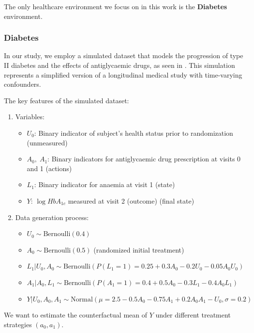 The only healthcare environment we focus on in this work is
the \textbf{Diabetes} environment.

\subsubsection{Diabetes}

In our study, we employ a simulated dataset that models
the progression of type II diabetes and the effects of antiglycaemic drugs,
as seen in \cite{sim2012}.
This simulation represents a simplified version of a longitudinal
medical study with time-varying confounders.

The key features of the simulated dataset:
\begin{enumerate}
    \item Variables:
    \begin{itemize}
        \item $U_0$: Binary indicator of subject's health status
        prior to randomization (unmeasured)
        \item $A_0,\; A_1$: Binary indicators for antiglycaemic
        drug prescription at visits 0 and 1 (actions)
        \item $L_1$: Binary indicator for anaemia at visit 1 (state)
        \item $Y$: $\log HbA_{1c}$ measured at visit 2 (outcome) (final state)
    \end{itemize}

    \item Data generation process:
    \begin{itemize}
        \item $U_0 \sim \text{Bernoulli}(0.4)$
        \item $A_0 \sim \text{Bernoulli}(0.5)$ (randomized initial treatment)
        \item $L_1 | U_0, A_0 \sim \text{Bernoulli}(P(L_1 = 1) = 0.25 + 0.3A_0 - 0.2U_0 - 0.05A_0U_0)$
        \item $A_1 | A_0, L_1 \sim \text{Bernoulli}(P(A_1 = 1) = 0.4 + 0.5A_0 - 0.3L_1 - 0.4A_0L_1)$
        \item $Y | U_0, A_0, A_1 \sim \text{Normal}(\mu = 2.5 - 0.5A_0 - 0.75A_1 + 0.2A_0A_1 - U_0, \sigma = 0.2)$
    \end{itemize}
\end{enumerate}

We want to estimate the counterfactual mean of \( Y \) under
different treatment strategies \( (a_0, a_1) \).

